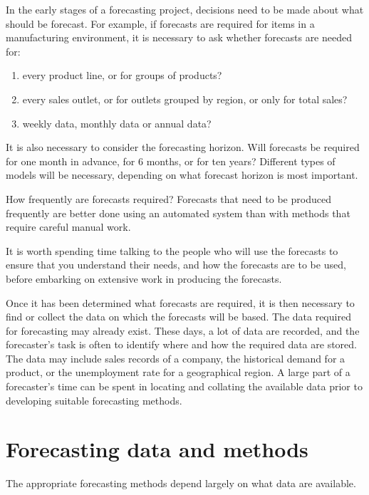 \documentclass[]{book}
\providecommand{\tightlist}{%
  \setlength{\itemsep}{0pt}\setlength{\parskip}{0pt}}
\begin{document}
In the early stages of a forecasting project, decisions need to be made about what should be forecast. For example, if forecasts are required for items in a manufacturing environment, it is necessary to ask whether forecasts are needed for:

\begin{enumerate}
\def\labelenumi{\arabic{enumi}.}
\tightlist
\item
  every product line, or for groups of products?
\item
  every sales outlet, or for outlets grouped by region, or only for total sales?
\item
  weekly data, monthly data or annual data?
\end{enumerate}

It is also necessary to consider the forecasting horizon. Will forecasts be required for one month in advance, for 6 months, or for ten years? Different types of models will be necessary, depending on what forecast horizon is most important.

How frequently are forecasts required? Forecasts that need to be produced frequently are better done using an automated system than with methods that require careful manual work.

It is worth spending time talking to the people who will use the forecasts to ensure that you understand their needs, and how the forecasts are to be used, before embarking on extensive work in producing the forecasts.

Once it has been determined what forecasts are required, it is then necessary to find or collect the data on which the forecasts will be based. The data required for forecasting may already exist. These days, a lot of data are recorded, and the forecaster's task is often to identify where and how the required data are stored. The data may include sales records of a company, the historical demand for a product, or the unemployment rate for a geographical region. A large part of a forecaster's time can be spent in locating and collating the available data prior to developing suitable forecasting methods.

\hypertarget{Intro-DataAndMethods}{%
\section{Forecasting data and methods}\label{Intro-DataAndMethods}}

The appropriate forecasting methods depend largely on what data are available.
\end{document}
